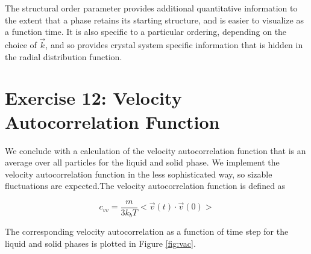 \documentclass[12pt, oneside]{article}
\begin{document}
The structural order parameter provides additional quantitative information to the extent that a phase retains its starting structure, and is easier to visualize as a function time. It is also specific to a particular ordering, depending on the choice of $\vec{k}$, and so provides crystal system specific information that is hidden in the radial distribution function. 


\section{Exercise 12: Velocity Autocorrelation Function}

We conclude with a calculation of the velocity autocorrelation function that is an average over all particles for the liquid and solid phase. We implement the velocity autocorrelation function in the less sophisticated way, so sizable fluctuations are expected.The velocity autocorrelation function is defined as 

\begin{equation}
	c_{vv} = \frac{m}{3 k_b T} < \vec{v}(t) \cdot \vec{v}(0) >
\end{equation}

The corresponding velocity autocorrelation as a function of time step for the liquid and solid phases is plotted in Figure \ref{fig:vac}.
\end{document}
